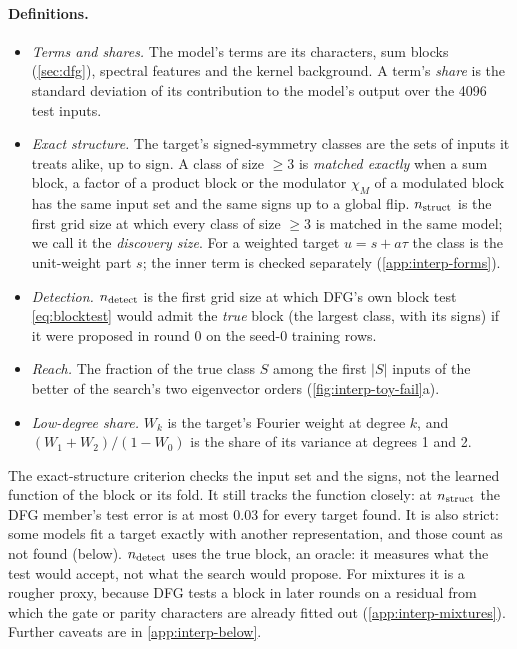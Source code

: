 \paragraph{Definitions.}
\begin{itemize}
\item \emph{Terms and shares.} The model's terms are its characters, sum blocks (\cref{sec:dfg}), spectral features and the kernel background. A term's \emph{share} is the standard deviation of its contribution to the model's output over the 4096 test inputs.
\item \emph{Exact structure.} The target's signed-symmetry classes are the sets of inputs it treats alike, up to sign. A class of size $\ge3$ is \emph{matched exactly} when a sum block, a factor of a product block or the modulator $\chi_M$ of a modulated block has the same input set and the same signs up to a global flip. $n_{\rm struct}$ is the first grid size at which every class of size $\ge3$ is matched in the same model; we call it the \emph{discovery size}. For a weighted target $u=s+a\tau$ the class is the unit-weight part $s$; the inner term is checked separately (\cref{app:interp-forms}).
\item \emph{Detection.} $n_{\rm detect}$ is the first grid size at which DFG's own block test \eqref{eq:blocktest} would admit the \emph{true} block (the largest class, with its signs) if it were proposed in round 0 on the seed-0 training rows.
\item \emph{Reach.} The fraction of the true class $S$ among the first $|S|$ inputs of the better of the search's two eigenvector orders (\cref{fig:interp-toy-fail}a).
\item \emph{Low-degree share.} $W_k$ is the target's Fourier weight at degree $k$, and $(W_1+W_2)/(1-W_0)$ is the share of its variance at degrees 1 and 2.
\end{itemize}
The exact-structure criterion checks the input set and the signs, not the learned function of the block or its fold. It still tracks the function closely: at $n_{\rm struct}$ the DFG member's test error is at most 0.03 for every target found. It is also strict: some models fit a target exactly with another representation, and those count as not found (below). $n_{\rm detect}$ uses the true block, an oracle: it measures what the test would accept, not what the search would propose. For mixtures it is a rougher proxy, because DFG tests a block in later rounds on a residual from which the gate or parity characters are already fitted out (\cref{app:interp-mixtures}). Further caveats are in \cref{app:interp-below}.

